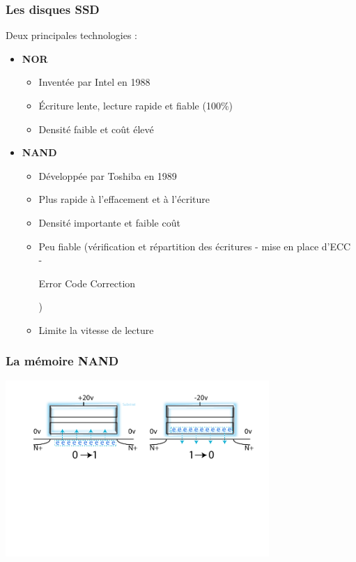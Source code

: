 \begin{frame}
\frametitle{Les disques SSD}
Deux principales technologies :
\begin{itemize}
\item \textbf{NOR}
\begin{itemize}
\item Inventée par Intel en 1988
\item Écriture lente, lecture rapide et fiable (100\%)
\item Densité faible et coût élevé
\end{itemize}
\item \textbf{NAND}
\begin{itemize}
\item Développée par Toshiba en 1989
\item Plus rapide à l'effacement et à l'écriture
\item Densité importante et faible coût
\item Peu fiable (vérification et répartition des écritures - mise en place d'ECC -\begin{tiny} Error Code Correction\end{tiny})
\item Limite la vitesse de lecture
\end{itemize}
\end{itemize}
\end{frame}

\begin{frame}
\frametitle{La mémoire NAND}
\begin{center}
\includegraphics[width=10cm]{../illustration/NAND_modif.pdf}
\end{center}
\end{frame}

